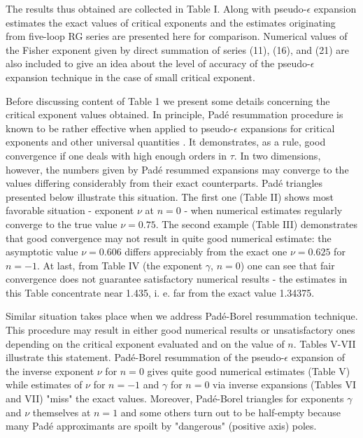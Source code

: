 \documentclass[aps,prb,preprint,showpacs,preprintnumbers,amsmath,amssymb]{revtex4}
\begin{document}
The results thus obtained are collected in Table I. Along with
pseudo-$\epsilon$ expansion estimates the exact values of critical
exponents and the estimates originating from five-loop RG series
\cite{OS2000} are presented here for comparison. Numerical values
of the Fisher exponent given by direct summation of series (11),
(16), and (21) are also included to give an idea about the level
of accuracy of the pseudo-$\epsilon$ expansion technique in the
case of small critical exponent.

Before discussing content of Table 1 we present some details concerning the critical
exponent values obtained. In principle, Pad\'e resummation procedure is known to be
rather effective when applied to pseudo-$\epsilon$ expansions for critical exponents
and other universal quantities \cite{FHY2000, HID2004, COPS2004, S2005}.
It demonstrates, as a rule, good convergence if one deals with high enough orders in
$\tau$. In two dimensions, however, the numbers given by Pad\'e resummed expansions
may converge to the values differing considerably from their exact counterparts.
Pad\'e triangles presented below illustrate this situation. The first one (Table II)
shows most favorable situation - exponent $\nu$ at $n = 0$ - when numerical
estimates regularly converge to the true value $\nu = 0.75$. The second example
(Table III) demonstrates that good convergence may not result in quite good numerical
estimate: the asymptotic value $\nu = 0.606$ differs appreciably from the exact one
$\nu = 0.625$ for $n = -1$. At last, from Table IV (the exponent $\gamma$, $n = 0$)
one can see that fair convergence does not guarantee satisfactory numerical results
- the estimates in this Table concentrate near 1.435, i. e. far from the exact value
1.34375.

Similar situation takes place when we address Pad\'e-Borel
resummation technique. This procedure may result in either good
numerical results or unsatisfactory ones depending on the critical
exponent evaluated and on the value of $n$. Tables V-VII
illustrate this statement. Pad\'e-Borel resummation of the
pseudo-$\epsilon$ expansion of the inverse exponent $\nu$ for $n =
0$ gives quite good numerical estimates (Table V) while estimates
of $\nu$ for $n = -1$ and $\gamma$ for $n = 0$ via inverse
expansions (Tables VI and VII) "miss" the exact values. Moreover,
Pad\'e-Borel triangles for exponents $\gamma$ and $\nu$ themselves
at $n = 1$ and some others turn out to be half-empty because many
Pad\'e approximants are spoilt by "dangerous" (positive axis)
poles.
\end{document}
